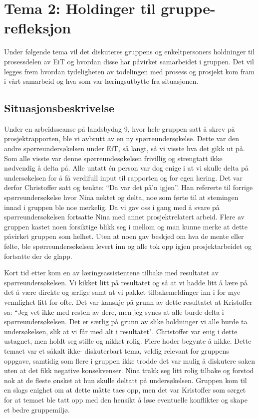 \chapter{Tema 2: Holdinger til gruppe{-}\\refleksjon}

Under følgende tema vil det diskuteres gruppens og enkeltpersoners holdninger til prosessdelen av EiT og hvordan
disse har påvirket samarbeidet i gruppen. Det vil legges frem hvordan tydeligheten av todelingen med prosess og 
prosjekt kom fram i vårt samarbeid og hva som var læringsutbytte fra situasjonen. 

\section{Situasjonsbeskrivelse}

Under en arbeidsseanse på landsbydag 9, hvor hele gruppen satt å skrev på prosjektrapporten, ble vi avbrutt av
en ny spørreundersøkelse. Dette var den andre spørreundersøkelsen under EiT, så langt, så vi visste hva det gikk ut på.
Som alle visste var denne spørreundesøkelsen frivillig og strengtatt ikke nødvendig å delta på. Alle untatt én person
var dog enige i at vi skulle delta på undersøkelsen for å få verdifull input til rapporten og for egen læring. Det var derfor
Christoffer satt og tenkte: ``Da var det på'n igjen''. Han refererte til forrige spørreundersøkelse hvor Nina nektet og delta,
noe som førte til at stemingen innad i gruppen ble noe merkelig. Da vi gav oss i gang med å svare på spørreundersøkelsen fortsatte Nina
med annet prosjektrelatert arbeid. Flere av gruppen kastet noen forsiktige blikk seg i mellom og man kunne merke at 
dette påvirket gruppen som helhet. Uten at noen gav beskjed om hva de mente eller følte, ble spørreundersøkelsen levert inn og 
alle tok opp igjen prosjektarbeidet og fortsatte der de glapp.

Kort tid etter kom en av læringsassistentene tilbake med resultatet av spørreundersøkelsen. Vi kikket litt på resultatet og 
så at vi hadde litt å lære på det å være direkte og ærlige samt at vi pakket tilbakemeldinger inn i for mye vennlighet litt for ofte.
Det var kanskje på grunn av dette resultatet at Kristoffer sa: ``Jeg vet ikke med resten av dere, men jeg synes at alle burde
delta i spørreundersøkelsen. Det er særlig på grunn av slike holdninger vi alle burde ta undersøkelsen, slik at vi får med alt
i resultatet". Christoffer var enig i dette ustagnet, men holdt seg stille og nikket rolig. Flere hoder begynte å nikke. 
Dette temaet var et  såkalt ikke- diskuterbart tema, veldig relevant for gruppens oppgave, 
samtidig som flere i gruppen ikke trodde det var mulig å diskutere saken uten at det fikk negative konsekvenser. 
\cite{Artikkel3} Nina 
trakk seg litt rolig tilbake og forstod nok at de fleste ønsket at hun skulle deltatt på undersøkelsen. Gruppen kom 
til en slags enighet om at dette måtte taes opp, men det var Kristoffer som sørget for at temaet ble tatt opp med den hensikt å løse eventuelle
konflikter og skape et bedre gruppemiljø.

